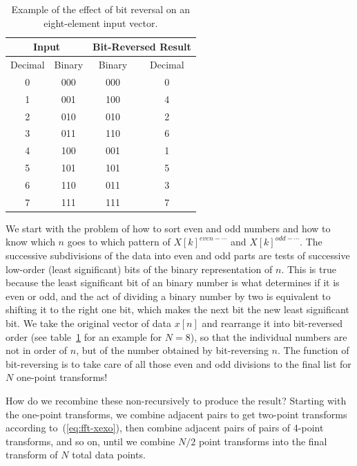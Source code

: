 \begin{table}
\caption{Example of the effect of bit reversal on an eight-element
input vector.\label{tb:fft-bitrevers}}
\begin{center}
\begin{tabular}{|c|c|c|c|} \hline
 \multicolumn{2}{|c|}{Input} & 
\multicolumn{2}{c|}{Bit-Reversed Result} \\ \hline
Decimal & Binary & Binary & Decimal \\ \hline\hline
0 & 000 & 000 & 0\\
1 & 001 & 100 & 4\\
2 & 010 & 010 & 2\\
3 & 011 & 110 & 6\\
4 & 100 & 001 & 1\\
5 & 101 & 101 & 5\\
6 & 110 & 011 & 3\\
7 & 111 & 111 & 7 \\ \hline
\end{tabular}
\end{center}
\end{table}

We start with the problem of how to sort even and odd numbers and how
to know which $n$ goes to which pattern of
$X[k]^\mathit{even-\cdots}$ and $X[k]^\mathit{odd-\cdots}$. The
successive subdivisions of the data into even and odd parts are tests
of successive low-order (least significant) bits of the binary
representation of $n$. This is true because the least significant bit
of an binary number is what determines if it is even or odd, and the
act of dividing a binary number by two is equivalent to shifting it to
the right one bit, which makes the next bit the new least significant
bit.  We take the original vector of data $x[n]$ and rearrange it into
bit-reversed order (see table~\ref{tb:fft-bitrevers} for an example
for $N=8$), so that the individual numbers are not in order of $n$,
but of the number obtained by bit-reversing $n$. The function of
bit-reversing is to take care of all those even and odd divisions to
the final list for $N$ one-point transforms!

How do we recombine these non-recursively to produce the result?
Starting with the one-point transforms, we combine adjacent pairs to
get two-point transforms according to~(\ref{eq:fft-xexo}), then
combine adjacent pairs of pairs of 4-point transforms, and so on,
until we combine $N/2$ point transforms into the final transform of
$N$ total data points.

